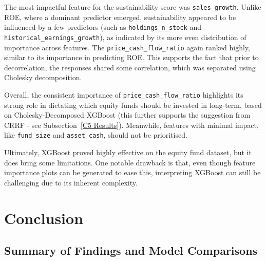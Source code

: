 \documentclass[11pt]{report} %
\begin{document}
The most impactful feature for the sustainability score was \texttt{sales\_growth}. Unlike ROE, where a dominant predictor emerged, sustainability appeared to be influenced by a few predictors (such as  \texttt{holdings\_n\_stock} and \texttt{historical\_earnings\_growth}), as indicated by its more even distribution of importance across features. 
The \texttt{price\_cash\_flow\_ratio} again ranked highly, similar to its importance in predicting ROE. This supports the fact that prior to decorrelation, the responses shared some correlation, which was separated using Cholesky decomposition. 

Overall, the consistent importance of \texttt{price\_cash\_flow\_ratio} highlights its strong role in dictating which equity funds should be invested in long-term, based on Cholesky-Decomposed XGBoost (this further supports the suggestion from CRRF - see Subsection~\ref{C5 Results}). Meanwhile, features with minimal impact, like \texttt{fund\_size} and \texttt{asset\_cash}, should not be prioritised. 

Ultimately, XGBoost proved highly effective on the equity fund dataset, but it does bring some limitations. One notable drawback is that, even though feature importance plots can be generated to ease this, interpreting XGBoost can still be challenging due to its inherent complexity.\cite{xgboosting2024}


\chapter{Conclusion}
\section{Summary of Findings and Model Comparisons}
\end{document}

